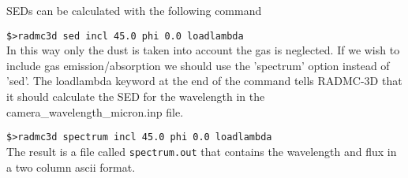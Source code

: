 \documentclass[12pt]{article}
\begin{document}
\begin{itemize}
SEDs can be calculated with the following command

{\tt\$>radmc3d sed incl 45.0 phi 0.0 loadlambda}\\
In this way only the dust is taken into account the gas is neglected. If we wish to include gas emission/absorption
we should use the 'spectrum' option instead of 'sed'. The loadlambda keyword at the end of the command tells
RADMC-3D that it should calculate the SED for the wavelength in the camera\_wavelength\_micron.inp file. 

{\tt\$>radmc3d spectrum incl 45.0 phi 0.0 loadlambda}\\
The result is a file called {\tt spectrum.out} that contains the wavelength and flux in a two column ascii format. 
\end{itemize}
\end{document}
